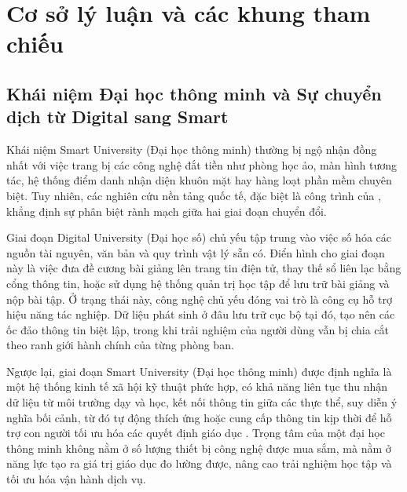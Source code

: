 \section{Cơ sở lý luận và các khung tham chiếu}

\subsection{Khái niệm Đại học thông minh và Sự chuyển dịch từ Digital sang Smart}
Khái niệm Smart University (Đại học thông minh) thường bị ngộ nhận đồng nhất với việc trang bị các công nghệ đắt tiền như phòng học ảo, màn hình tương tác, hệ thống điểm danh nhận diện khuôn mặt hay hàng loạt phần mềm chuyên biệt. Tuy nhiên, các nghiên cứu nền tảng quốc tế, đặc biệt là công trình của \citet{uskov2018}, khẳng định sự phân biệt rành mạch giữa hai giai đoạn chuyển đổi.

Giai đoạn Digital University (Đại học số) chủ yếu tập trung vào việc số hóa các nguồn tài nguyên, văn bản và quy trình vật lý sẵn có. Điển hình cho giai đoạn này là việc đưa đề cương bài giảng lên trang tin điện tử, thay thế sổ liên lạc bằng cổng thông tin, hoặc sử dụng hệ thống quản trị học tập để lưu trữ bài giảng và nộp bài tập. Ở trạng thái này, công nghệ chủ yếu đóng vai trò là công cụ hỗ trợ hiệu năng tác nghiệp. Dữ liệu phát sinh ở đâu lưu trữ cục bộ tại đó, tạo nên các ốc đảo thông tin biệt lập, trong khi trải nghiệm của người dùng vẫn bị chia cắt theo ranh giới hành chính của từng phòng ban.

Ngược lại, giai đoạn Smart University (Đại học thông minh) được định nghĩa là một hệ thống kinh tế xã hội kỹ thuật phức hợp, có khả năng liên tục thu nhận dữ liệu từ môi trường dạy và học, kết nối thông tin giữa các thực thể, suy diễn ý nghĩa bối cảnh, từ đó tự động thích ứng hoặc cung cấp thông tin kịp thời để hỗ trợ con người tối ưu hóa các quyết định giáo dục \citep{uskov2018}. Trọng tâm của một đại học thông minh không nằm ở số lượng thiết bị công nghệ được mua sắm, mà nằm ở năng lực tạo ra giá trị giáo dục đo lường được, nâng cao trải nghiệm học tập và tối ưu hóa vận hành dịch vụ.

